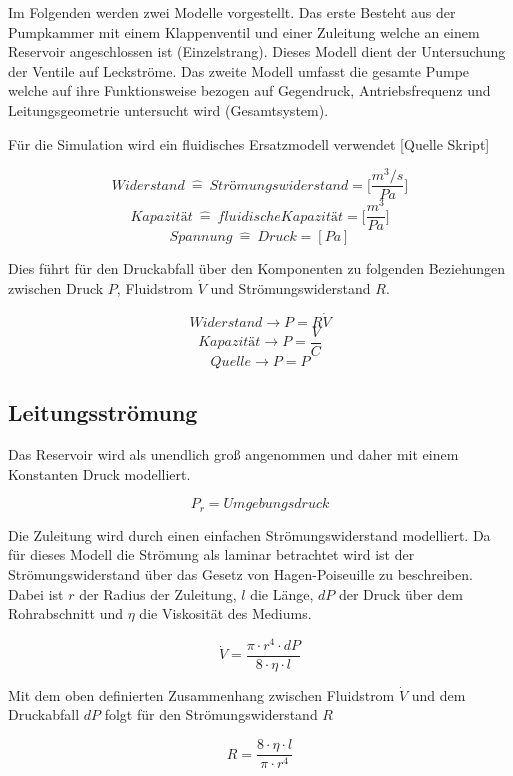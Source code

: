 \documentclass[fontsize=12pt, a4paper]{scrartcl}
\begin{document}
Im Folgenden werden zwei Modelle vorgestellt. Das erste Besteht aus der Pumpkammer mit einem Klappenventil und einer Zuleitung welche an einem Reservoir angeschlossen ist (Einzelstrang). Dieses Modell dient der Untersuchung der Ventile auf Leckströme. Das zweite Modell umfasst die gesamte Pumpe welche auf ihre Funktionsweise bezogen auf Gegendruck, Antriebsfrequenz und Leitungsgeometrie untersucht wird (Gesamtsystem).

Für die Simulation wird ein fluidisches Ersatzmodell verwendet [Quelle Skript]

\[ Widerstand \:\widehat{=}\:  Strömungswiderstand = \biggl[\frac{m^3/s}{Pa}\biggr] \]
\[ Kapazität  \:\widehat{=}\:  fluidische Kapazität = \biggl[\frac{m^3}{Pa}\biggr] \]
\[ Spannung  \:\widehat{=}\:  Druck = [Pa] \]

Dies führt für den Druckabfall über den Komponenten zu folgenden Beziehungen zwischen Druck \(P\), Fluidstrom \(\dot{V}\) und Strömungswiderstand \(R\).

\[Widerstand \rightarrow P = R\dot{V} \]
\[Kapazität \rightarrow P = \frac{V}{C} \]
\[Quelle \rightarrow P = P \]

\subsection{Leitungsströmung}
\label{subsec:reservoirsection}
Das Reservoir wird als unendlich groß angenommen und daher mit einem Konstanten Druck modelliert.


\[ P_r = Umgebungsdruck \]

Die Zuleitung wird durch einen einfachen Strömungswiderstand modelliert. Da für dieses Modell die Strömung als laminar betrachtet wird ist der Strömungswiderstand über das Gesetz von Hagen-Poiseuille zu beschreiben. Dabei ist \( r \) der Radius der Zuleitung, \(l\) die Länge, \(dP\) der Druck über dem Rohrabschnitt und \(\eta\) die Viskosität des Mediums.

\begin{equation}
	\dot{V} = \frac{\pi \cdot r^4 \cdot dP}{8 \cdot \eta \cdot l}
	\label{eq:hagenpois}
\end{equation}

Mit dem oben definierten Zusammenhang zwischen Fluidstrom \(\dot{V}\) und dem Druckabfall \(dP\) folgt für den Strömungswiderstand \(R\)

\begin{equation}
	R = \frac{8 \cdot \eta \cdot l}{\pi \cdot r^4}
\label{eq:leckagestrom}
\end{equation}
\end{document}
